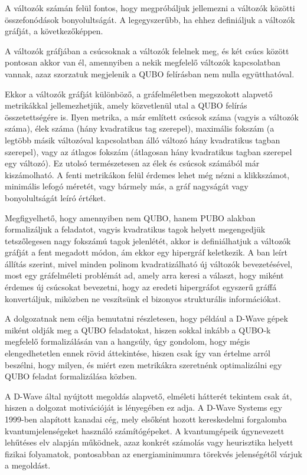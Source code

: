 A változók számán felül fontos, hogy megpróbáljuk jellemezni a változók közötti összefonódások bonyolultságát. A legegyszerűbb, ha ehhez definiáljuk a változók gráfját, a következőképpen.

A változók gráfjában a csúcsoknak a változók felelnek meg, és két csúcs között pontosan akkor van él, amennyiben a nekik megfelelő változók kapcsolatban vannak, azaz szorzatuk megjelenik a QUBO felírásban nem nulla együtthatóval.

Ekkor a változók gráfját különböző, a gráfelméletben megszokott alapvető metrikákkal jellemezhetjük, amely közvetlenül utal a QUBO felírás összetettségére is. Ilyen metrika, a már említett csúcsok száma (vagyis a változók száma), élek száma (hány kvadratikus tag szerepel), maximális fokszám (a legtöbb másik változóval kapcsolatban álló változó hány kvadratikus tagban szerepel), vagy az átlagos fokszám (átlagosan hány kvadratikus tagban szerepel egy változó). Ez utolsó természetesen az élek és csúcsok számából már kiszámolható. A fenti metrikákon felül érdemes lehet még nézni a klikkszámot, minimális lefogó méretét, vagy bármely más, a gráf nagyságát vagy bonyolultságát leíró értéket.

Megfigyelhető, hogy amennyiben nem QUBO, hanem PUBO alakban formalizáljuk a feladatot, vagyis kvadratikus tagok helyett megengedjük tetszőlegesen nagy fokszámú tagok jelenlétét, akkor is definiálhatjuk a változók gráfját a fent megadott módon, ám ekkor egy hipergráf keletkezik. A ban leírt állítás szerint, mivel minden polinom kvadratizálható új változók bevezetésével, most egy gráfelméleti problémát ad, amely arra keresi a választ, hogy miként érdemes új csúcsokat bevezetni, hogy az eredeti hipergráfot egyszerű gráffá konvertáljuk, miközben ne veszítsünk el bizonyos strukturális információkat.


A dolgozatnak nem célja bemutatni részletesen, hogy például a D-Wave gépek miként oldják meg a QUBO feladatokat, hiszen sokkal inkább a QUBO-k megfelelő formalizálásán van a hangsúly, úgy gondolom, hogy mégis elengedhetetlen ennek rövid áttekintése, hiszen csak így van értelme arról beszélni, hogy milyen, és miért ezen metrikákra szeretnénk optimalizálni egy QUBO feladat formalizálása közben.

A D-Wave által nyújtott megoldás alapvető, elméleti hátterét tekintem csak át, hiszen a dolgozat motivációját is lényegében ez adja. A D-Wave Systems egy 1999-ben alapított kanadai cég, mely elsőként hozott kereskedelmi forgalomba kvantumjelenségeket használó számítógépeket. A kvantumgépeik úgynevezett lehűtéses elv alapján működnek, azaz konkrét számolás vagy heurisztika helyett fizikai folyamatok, pontosabban az energiaminimumra törekvés jelenségétől várjuk a megoldást. \cite{Szabo}

